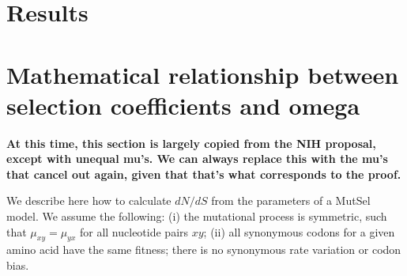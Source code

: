 \documentclass[11pt]{article}
\begin{document}
\section*{Results}


\section*{Mathematical relationship between selection coefficients and omega}

\textbf{At this time, this section is largely copied from the NIH proposal, except with unequal mu's. We can always replace this with the mu's that cancel out again, given that that's what corresponds to the proof.}

We describe here how to calculate $dN/dS$ from the parameters of a MutSel model. We assume the following: (i) the mutational process is symmetric, such that $\mu_{xy}=\mu_{yx}$ for all nucleotide pairs $xy$; (ii) all synonymous codons for a given amino acid have the same fitness; there is no synonymous rate variation or codon bias.
\end{document}
